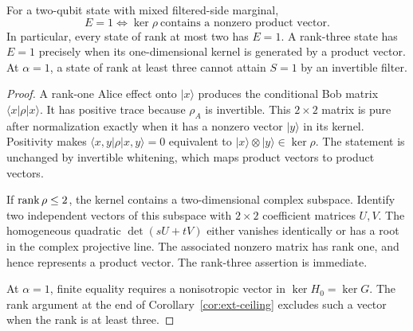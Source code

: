 \begin{proposition}
\label{prop:ext-product-kernel}
For a two-qubit state with mixed filtered-side marginal,
\begin{equation}
 E=1\iff\ker\rho\ \text{contains a nonzero product vector}.
 \label{eq:ext-product-kernel}
\end{equation}
In particular, every state of rank at most two has $E=1$.
A rank-three state has $E=1$ precisely when its one-dimensional
kernel is generated by a product vector. At $\alpha=1$, a state of
rank at least three cannot attain $S=1$ by an invertible filter.
\end{proposition}

\begin{proof}
A rank-one Alice effect onto $|x\rangle$ produces the conditional
Bob matrix $\langle x|\rho|x\rangle$. It has positive trace because
$\rho_A$ is invertible. This $2\times2$ matrix is pure after
normalization exactly when it has a nonzero vector $|y\rangle$ in
its kernel. Positivity makes
$\langle x,y|\rho|x,y\rangle=0$ equivalent to
$|x\rangle\otimes|y\rangle\in\ker\rho$. The statement is unchanged
by invertible whitening, which maps product vectors to product vectors.

If $\operatorname{rank}\rho\le2$, the kernel contains a two-dimensional complex
subspace. Identify two independent vectors of this subspace with
$2\times2$ coefficient matrices $U,V$. The homogeneous quadratic
$\det(sU+tV)$ either vanishes identically or has a root in the complex
projective line. The associated nonzero matrix has rank one, and hence
represents a product vector. The rank-three assertion is immediate.

At $\alpha=1$, finite equality requires a nonisotropic vector in
$\ker H_0=\ker G$. The rank argument at the end of
Corollary~\ref{cor:ext-ceiling} excludes such a vector when the rank
is at least three.
\end{proof}

